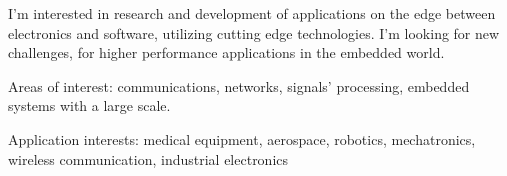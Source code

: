 


\begin{cventries}


\begin{flushleft}

I'm interested in research and development of applications on the edge between electronics and software, utilizing cutting edge
technologies. I'm looking for new challenges, for higher performance applications in the embedded world.
\newline

Areas of interest: communications, networks, signals' processing, embedded systems with a large scale. 
\newline

Application interests: medical equipment, aerospace, robotics, mechatronics, wireless communication, industrial electronics
\end{flushleft}


\end{cventries}